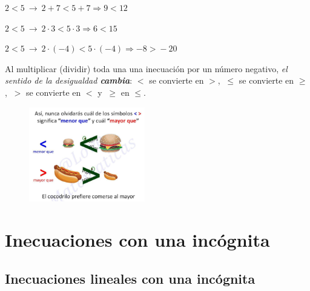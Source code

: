 \begin{multicols}{2}
	\begin{destacado}
	\vspace{2mm}$2<5 \ \to \ 2+7<5+7\Rightarrow 9<12$

	$2<5 \ \to \ 2\cdot 3 < 5\cdot 3 \Rightarrow 6<15$

	$2<5 \ \to \ 2\cdot (-4) < 5\cdot (-4) \Rightarrow -8 \boldsymbol >-20$

	\vspace{2mm}Al multiplicar (dividir) toda una una inecuación por un número negativo, \emph{el sentido de la desigualdad \textbf{cambia}}: $<$ se convierte en $>$, $\ \leqslant$ se convierte en $\geqslant$, $\ >$ se convierte en $<$ y $\ \geqslant$ en $\leqslant$.
	\vspace{2mm}
	\end{destacado}

	\begin{figure}[H]
		\centering
		\includegraphics[width=0.45\textwidth]{img-ecc/ecc10.png}
	\end{figure}
\end{multicols}




\vspace{1cm}
\section{Inecuaciones con una incógnita}
\vspace{0.5cm}

\subsection{Inecuaciones lineales con una incógnita}
\vspace{0.5cm}

